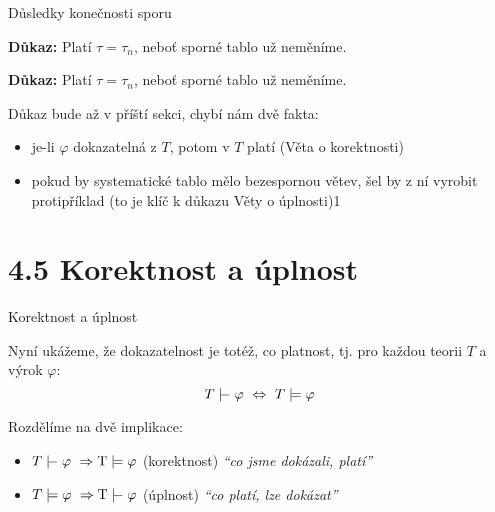 \documentclass{beamer}
\begin{document}
\begin{frame}{Důsledky konečnosti sporu}
    

    \textbf{Důkaz:} 
    Platí $\tau=\tau_n$, neboť sporné tablo už neměníme.\hfill\qedsymbol   
    
    \bigskip


    \textbf{Důkaz:} 
    Platí $\tau=\tau_n$, neboť sporné tablo už neměníme.\hfill\qedsymbol   

    \bigskip


    Důkaz bude až v příští sekci, chybí nám dvě fakta:
    \begin{itemize}
        \item je-li $\varphi$ dokazatelná z $T$, potom v $T$ platí (Věta o korektnosti)
        \item pokud by systematické tablo mělo bezespornou větev, šel by z ní vyrobit protipříklad (to je klíč k důkazu Věty o úplnosti)1
    \end{itemize}

\end{frame}


\section{4.5 Korektnost a úplnost}


\begin{frame}{Korektnost a úplnost}
    
    Nyní ukážeme, že \alert{dokazatelnost} je totéž, co \alert{platnost}, tj. pro každou teorii $T$ a výrok $\varphi$:
    \alert{
    $$
    T\proves\varphi\ \Leftrightarrow\ T\models\varphi
    $$
    }

    Rozdělíme na dvě implikace: 
    
    \begin{itemize}
        \item \alert{$T\proves\varphi\ \Rightarrow\T\models\varphi$} \hspace{0.5cm} (korektnost) \hfill {\it``co jsme dokázali, platí''}
        \item\alert{$T\models\varphi\ \Rightarrow\T\proves\varphi$}  \hspace{0.5cm} (úplnost) \hfill {\it ``co platí, lze dokázat''}
    \end{itemize} 
 
\end{frame}
\end{document}

